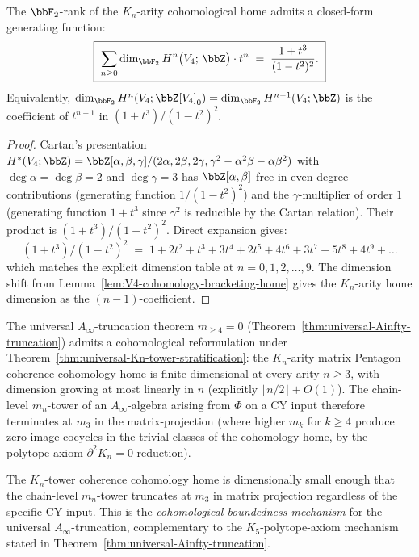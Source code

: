 \begin{corollary}
\label{cor:Kn-cohomology-generating-function}
The $\bbF_2$-rank of the $K_n$-arity cohomological home admits a closed-form
generating function:
\[
 \boxed{\;\sum_{n \geq 0} \dim_{\bbF_2} H^n\bigl(V_4;\, \bbZ\bigr) \cdot t^n
 \;=\; \frac{1 + t^3}{(1 - t^2)^2}.\;}
\]
Equivalently, $\dim_{\bbF_2} H^n(V_4; \bbZ[V_4]_0) = \dim_{\bbF_2} H^{n-1}(V_4; \bbZ)$
is the coefficient of $t^{n-1}$ in $(1 + t^3)/(1 - t^2)^2$.
\end{corollary}

\begin{proof}
Cartan's presentation
$H^*(V_4; \bbZ) = \bbZ[\alpha, \beta, \gamma]/(2\alpha, 2\beta, 2\gamma, \gamma^2 - \alpha^2 \beta - \alpha \beta^2)$
with $\deg \alpha = \deg \beta = 2$ and $\deg \gamma = 3$ has $\bbZ[\alpha, \beta]$
free in even degree contributions \textup{(}generating function $1/(1 - t^2)^2$\textup{)}
and the $\gamma$-multiplier of order $1$ \textup{(}generating function $1 + t^3$
since $\gamma^2$ is reducible by the Cartan relation\textup{).} Their product
is $(1 + t^3)/(1 - t^2)^2$. Direct expansion gives:
\[
 (1 + t^3)/(1 - t^2)^2 \;=\; 1 + 2 t^2 + t^3 + 3 t^4 + 2 t^5 + 4 t^6 + 3 t^7 + 5 t^8 + 4 t^9 + \ldots
\]
which matches the explicit dimension table at $n = 0, 1, 2, \ldots, 9$. The
dimension shift from Lemma~\ref{lem:V4-cohomology-bracketing-home} gives the
$K_n$-arity home dimension as the $(n-1)$-coefficient.
\end{proof}

\begin{remark}[Universal \texorpdfstring{$A_\infty$}{A-inf}-truncation \texorpdfstring{$m_{\geq 4} = 0$}{m->= 4 = 0} as
 cohomological boundedness]
\label{rem:Ainfty-truncation-cohomological}
The universal $A_\infty$-truncation theorem $m_{\geq 4} = 0$
\textup{(}Theorem~\ref{thm:universal-Ainfty-truncation}\textup{)} admits
a cohomological reformulation under
Theorem~\ref{thm:universal-Kn-tower-stratification}: the $K_n$-arity
matrix Pentagon coherence cohomology home is finite-dimensional at every
arity $n \geq 3$, with dimension growing at most linearly in $n$
\textup{(}explicitly $\lfloor n/2 \rfloor + O(1)$\textup{).} The
chain-level $m_n$-tower of an $A_\infty$-algebra arising from $\Phi$ on a
CY input therefore terminates at $m_3$ in the matrix-projection
\textup{(}where higher $m_k$ for $k \geq 4$ produce zero-image cocycles
in the trivial classes of the cohomology home, by the polytope-axiom
$\partial^2 K_n = 0$ reduction\textup{).}

The $K_n$-tower coherence cohomology home is dimensionally small enough
that the chain-level $m_n$-tower truncates at $m_3$ in matrix projection
regardless of the specific CY input. This is the
\emph{cohomological-boundedness mechanism} for the universal
$A_\infty$-truncation, complementary to the $K_5$-polytope-axiom
mechanism stated in Theorem~\ref{thm:universal-Ainfty-truncation}.
\end{remark}


